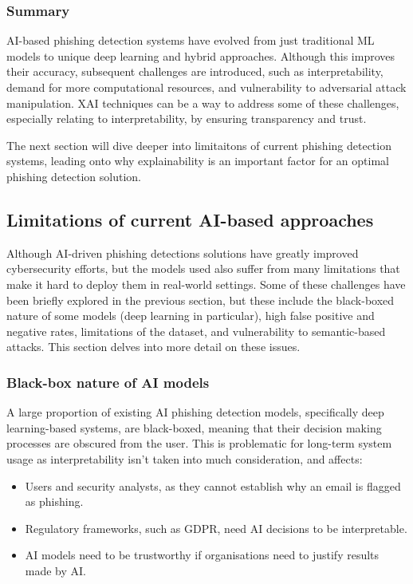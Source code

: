 \subsubsection*{Summary}
AI-based phishing detection systems have evolved from just traditional ML models to unique deep learning and hybrid approaches. Although this improves their accuracy, subsequent challenges are introduced, such as interpretability, demand for more computational resources, and vulnerability to adversarial attack manipulation. XAI techniques can be a way to address some of these challenges, especially relating to interpretability, by ensuring transparency and trust.\newline

\noindent The next section will dive deeper into limitaitons of current phishing detection systems, leading onto why explainability is an important factor for an optimal phishing detection solution.

\newpage

\subsection*{Limitations of current AI-based approaches}
Although AI-driven phishing detections solutions have greatly improved cybersecurity efforts, but the models used also suffer from many limitations that make it hard to deploy them in real-world settings. Some of these challenges have been briefly explored in the previous section, but these include the black-boxed nature of some models (deep learning in particular), high false positive and negative rates, limitations of the dataset, and vulnerability to semantic-based attacks. This section delves into more detail on these issues.

\subsubsection*{Black-box nature of AI models}
A large proportion of existing AI phishing detection models, specifically deep learning-based systems, are black-boxed, meaning that their decision making processes are obscured from the user. This is problematic for long-term system usage as interpretability isn't taken into much consideration, and affects:

\begin{itemize}
    \item Users and security analysts, as they cannot establish why an email is flagged as phishing.
    \item Regulatory frameworks, such as GDPR, need AI decisions to be interpretable.
    \item AI models need to be trustworthy if organisations need to justify results made by AI.
\end{itemize}

